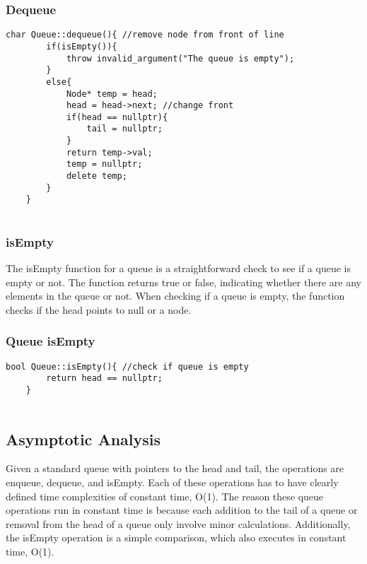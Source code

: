 \documentclass[letterpaper, 10pt,DIV=13]{scrartcl}
\numberwithin{equation}{section} %
\numberwithin{figure}{section} %
\numberwithin{table}{section} %
\begin{document}
\pagebreak

\subsubsection*{Dequeue}
    \lstset{numbers=left, numberstyle=\tiny, stepnumber=1, numbersep=5pt, basicstyle=\footnotesize\ttfamily}
    \begin{lstlisting}[frame=single, ]
    char Queue::dequeue(){ //remove node from front of line
        if(isEmpty()){
            throw invalid_argument("The queue is empty");
        }
        else{
            Node* temp = head;
            head = head->next; //change front
            if(head == nullptr){
                tail = nullptr;
            }
            return temp->val;
            temp = nullptr;
            delete temp;
        }
    }
    
\end{lstlisting}

\subsubsection{isEmpty}
The isEmpty function for a queue is a straightforward check to see if a queue is empty or not. The function returns true or false, indicating whether there are any elements in the queue or not. When checking if a queue is empty, the function checks if the head points to null or a node.

\subsubsection*{Queue isEmpty}
    \lstset{numbers=left, numberstyle=\tiny, stepnumber=1, numbersep=5pt, basicstyle=\footnotesize\ttfamily}
    \begin{lstlisting}[frame=single, ]
    bool Queue::isEmpty(){ //check if queue is empty
        return head == nullptr;
    }
    
\end{lstlisting}


\subsection{Asymptotic Analysis}
Given a standard queue with pointers to the head and tail, the operations are enqueue, dequeue, and isEmpty. Each of these operations has to have clearly defined time complexities of constant time, O(1). The reason these queue operations run in constant time is because each addition to the tail of a queue or removal from the head of a queue only involve minor calculations. Additionally, the isEmpty operation is a simple comparison, which also executes in constant time, O(1).
\end{document}

